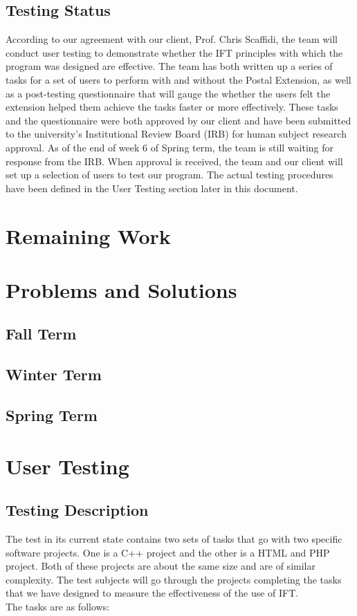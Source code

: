 \documentclass[letterpaper,10pt,titlepage,draftclsnofoot,onecolumn,onesided] {IEEEtran}
\begin{document}
	\subsection{Testing Status}
	According to our agreement with our client, Prof. Chris Scaffidi, the team will conduct user testing to demonstrate whether the IFT principles with which the program was designed are effective.
	The team has both written up a series of tasks for a set of users to perform with and without the Postal Extension, as well as a post-testing questionnaire that will gauge the whether the users felt the extension helped them achieve the tasks faster or more effectively.
	These tasks and the questionnaire were both approved by our client and have been submitted to the university's Institutional Review Board (IRB) for human subject research approval.
	As of the end of week 6 of Spring term, the team is still waiting for response from the IRB.
	When approval is received, the team and our client will set up a selection of users to test our program.
	The actual testing procedures have been defined in the User Testing section later in this document.
	
\section{Remaining Work}


\section{Problems and Solutions}
	\subsection{Fall Term}
	
	
	\subsection{Winter Term}
	
	
	\subsection{Spring Term}

\section{User Testing}
	

	\subsection{Testing Description}
	The test in its current state contains two sets of tasks that go with two specific software projects. 
	One is a C++ project and the other is a HTML and PHP project. 
	Both of these projects are about the same size and are of similar complexity. 
	The test subjects will go through the projects completing the tasks that we have designed to measure the effectiveness of the use of IFT. 
	\\
	The tasks are as follows: 
	
\end{document}
